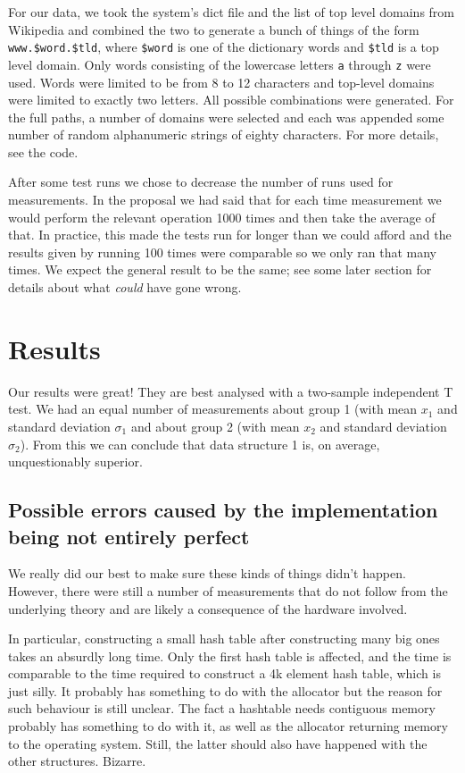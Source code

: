 \documentclass[12pt,a4paper]{article}
\begin{document}
    For our data, we took the system's dict file and the list of top level domains from Wikipedia
    and combined the two to generate a bunch of things of the form \texttt{www.\$word.\$tld}, where
    \texttt{\$word} is one of the dictionary words and \texttt{\$tld} is a top level domain.  Only
    words consisting of the lowercase letters \texttt{a} through \texttt{z} were used.  Words were
    limited to be from 8 to 12 characters and top-level domains were limited to exactly two letters.
    All possible combinations were generated.  For the full paths, a number of domains were selected
    and each was appended some number of random alphanumeric strings of eighty characters.  For more
    details, see the code.

    After some test runs we chose to decrease the number of runs used for measurements.  In the
    proposal we had said that for each time measurement we would perform the relevant operation 1000
    times and then take the average of that.  In practice, this made the tests run for longer than
    we could afford and the results given by running 100 times were comparable so we only ran that
    many times.  We expect the general result to be the same; see some later section for details
    about what \emph{could} have gone wrong.

    \section{Results}

    Our results were great!  They are best analysed with a two-sample independent T test.  We had an
    equal number of measurements about group 1 (with mean $x_1$ and standard deviation $\sigma_1$ and
    about group 2 (with mean $x_2$ and standard deviation $\sigma_2$).  From this we can conclude that
    data structure 1 is, on average, unquestionably superior.

    \subsection{Possible errors caused by the implementation being not entirely perfect}

    We really did our best to make sure these kinds of things didn't happen.  However, there were
    still a number of measurements that do not follow from the underlying theory and are likely a
    consequence of the hardware involved.

    In particular, constructing a small hash table after constructing many big ones takes an
    absurdly long time.  Only the first hash table is affected, and the time is comparable to the
    time required to construct a 4k element hash table, which is just silly.  It probably has
    something to do with the allocator but the reason for such behaviour is still unclear.  The fact
    a hashtable needs contiguous memory probably has something to do with it, as well as the
    allocator returning memory to the operating system.  Still, the latter should also have happened
    with the other structures.  Bizarre.
\end{document}
